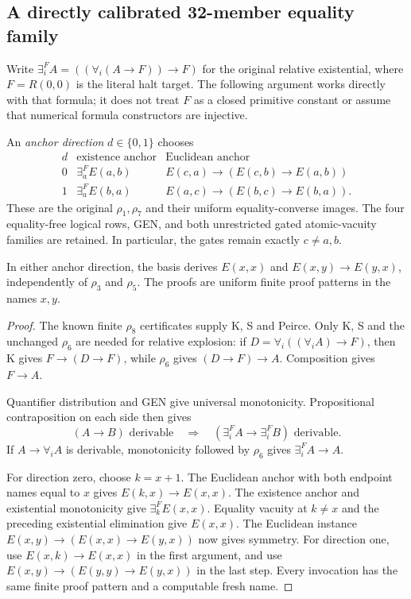\subsection{A directly calibrated 32-member equality family}

Write $\exists^F_i A=((\forall_i(A\to F))\to F)$ for the
original relative existential, where $F=R(0,0)$ is the literal
halt target.  The following argument works directly with that
formula; it does not treat $F$ as a closed primitive constant or
assume that numerical formula constructors are injective.

An \emph{anchor direction} $d\in\{0,1\}$ chooses
\[
\begin{array}{c|cc}
d&\text{existence anchor}&\text{Euclidean anchor}\\\hline
0&\exists^F_a E(a,b)&E(c,a)\to(E(c,b)\to E(a,b))\\
1&\exists^F_a E(b,a)&E(a,c)\to(E(b,c)\to E(b,a)).
\end{array}
\]
These are the original $\rho_1,\rho_7$ and their uniform
equality-converse images.  The four equality-free logical rows,
GEN, and both unrestricted gated atomic-vacuity families are
retained.  In particular, the gates remain exactly $c\ne a,b$.

\begin{lemma}
In either anchor direction, the basis derives
$E(x,x)$ and $E(x,y)\to E(y,x)$, independently of $\rho_3$
and $\rho_5$.  The proofs are uniform finite proof patterns in
the names $x,y$.
\end{lemma}

\begin{proof}
The known finite $\rho_8$ certificates supply K, S and Peirce.
Only K, S and the unchanged $\rho_6$ are needed for relative
explosion: if $D=\forall_i((\forall_i A)\to F)$, then K gives
$F\to(D\to F)$, while $\rho_6$ gives $(D\to F)\to A$.
Composition gives $F\to A$.

Quantifier distribution and GEN give universal monotonicity.
Propositional contraposition on each side then gives
\[
 (A\to B)\text{ derivable}
 \quad\Longrightarrow\quad
 (\exists^F_i A\to\exists^F_i B)\text{ derivable}.
\]
If $A\to\forall_i A$ is derivable, monotonicity followed by
$\rho_6$ gives $\exists^F_i A\to A$.

For direction zero, choose $k=x+1$.  The Euclidean anchor with
both endpoint names equal to $x$ gives $E(k,x)\to E(x,x)$.
The existence anchor and existential monotonicity give
$\exists^F_k E(x,x)$.  Equality vacuity at $k\ne x$ and the
preceding existential elimination give $E(x,x)$.
The Euclidean instance
$E(x,y)\to(E(x,x)\to E(y,x))$ now gives symmetry.
For direction one, use $E(x,k)\to E(x,x)$ in the first argument,
and use
$E(x,y)\to(E(y,y)\to E(y,x))$ in the last step.
Every invocation has the same finite proof pattern and a
computable fresh name.
\end{proof}

